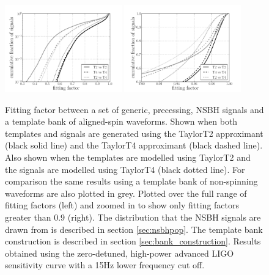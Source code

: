 \begin{figure}
    \centering
    \begin{minipage}[l]{\columnwidth}
    \centering
\includegraphics[width=0.45\textwidth]
{papers/nsbh_effectualness/figure7A.pdf}
\includegraphics[width=0.45\textwidth]
{papers/nsbh_effectualness/figure7B.pdf}
\caption{\label{fig:aspineffectualness}
Fitting factor between a set of generic, precessing, NSBH signals and a
template bank of aligned-spin waveforms. Shown when both templates and signals
are generated using
the TaylorT2 approximant (black solid line) and the TaylorT4 approximant (black
dashed line).
Also shown when the templates are modelled using TaylorT2 and the signals are
modelled using TaylorT4 (black dotted line). For comparison the same results 
using a template bank of non-spinning waveforms are also plotted in grey. 
Plotted
over the full range of fitting factors (left) and zoomed in to show only
fitting factors greater than 0.9 (right). The
distribution that the NSBH signals are drawn from is described in section
\ref{sec:nsbhpop}. The template bank construction is described in section
\ref{sec:bank_construction}. Results obtained
using the zero-detuned, high-power advanced LIGO sensitivity curve with a 15Hz
lower frequency cut off.
}
\end{minipage}
\end{figure}


